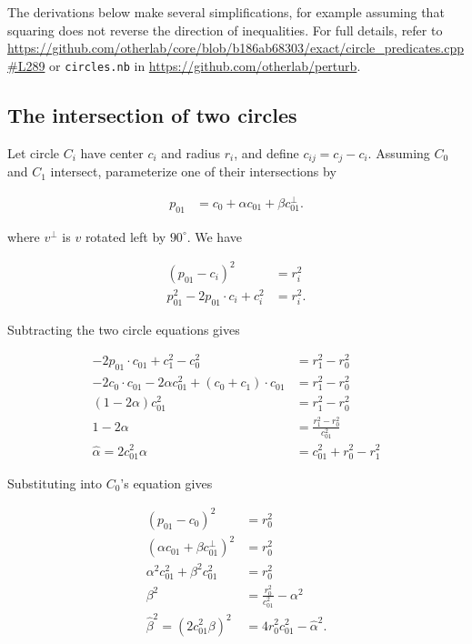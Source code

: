 \documentclass[11pt]{article}
\newcommand{\halpha}{\hat{\alpha}}
\newcommand{\hbeta}{\hat{\beta}}
\begin{document}
The derivations below make several simplifications, for example assuming that squaring does not reverse the direction of inequalities.  For full details, refer to
\url{https://github.com/otherlab/core/blob/b186ab68303/exact/circle_predicates.cpp#L289} or \verb+circles.nb+ in \url{https://github.com/otherlab/perturb}.

\subsection{The intersection of two circles}

Let circle $C_i$ have center $c_i$ and radius $r_i$, and define $c_{ij} = c_j - c_i$.  Assuming $C_0$ and $C_1$ intersect, parameterize one of their intersections by
\begin{linenomath*}
\begin{align*}
p_{01} &= c_0 + \alpha c_{01} + \beta c_{01}^\perp.
\end{align*}
\end{linenomath*}
where $v^\perp$ is $v$ rotated left by $90^\circ$.  We have
\begin{linenomath*}
\begin{align*}
(p_{01} - c_i)^2 &= r_i^2 \\
p_{01}^2 - 2p_{01} \cdot c_i + c_i^2 &= r_i^2.
\end{align*}
\end{linenomath*}
Subtracting the two circle equations gives
\begin{linenomath*}
\begin{align*}
-2p_{01} \cdot c_{01} + c_1^2 - c_0^2 &= r_1^2 - r_0^2 \\
-2c_0 \cdot c_{01} -2\alpha c_{01}^2 + (c_0 + c_1) \cdot c_{01} &= r_1^2 - r_0^2 \\
(1-2\alpha) c_{01}^2 &= r_1^2 - r_0^2 \\
1 - 2 \alpha &= \frac{r_1^2 - r_0^2}{c_{01}^2} \\
\halpha = 2 c_{01}^2 \alpha &= c_{01}^2 + r_0^2 - r_1^2
\end{align*}
\end{linenomath*}
Substituting into $C_0$'s equation gives
\begin{linenomath*}
\begin{align*}
(p_{01} - c_0)^2 &= r_0^2 \\
\left(\alpha c_{01} + \beta c_{01}^\perp \right)^2 &= r_0^2 \\
\alpha^2 c_{01}^2 + \beta^2 c_{01}^2 &= r_0^2 \\
\beta^2 &= \frac{r_0^2}{c_{01}^2} - \alpha^2 \\
\hbeta^2 = \left(2 c_{01}^2 \beta\right)^2 &= 4 r_0^2 c_{01}^2 - \halpha^2.
\end{align*}
\end{linenomath*}
\end{document}
